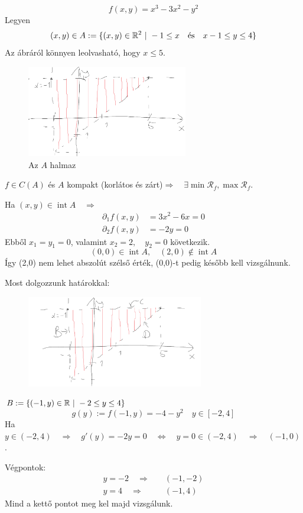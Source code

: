 \documentclass[a4paper,11.5pt]{article}
\DeclareMathOperator{\Int}{int}
\begin{document}
	\begin{task}
		\[ f(x,y)=x^3-3x^2-y^2 \]
		Legyen
		\[ (x,y)\in A:=\{ (x,y)\in\R^2\ | \ -1\leq x\quad \text{és}\quad x-1\leq y\leq 4 \} \]
		Az ábráról könnyen leolvasható, hogy $x\leq 5$.
		\begin{figure}[H]
			\centering
			\includegraphics[height=4cm]{../2zh/kepek/49.png}
			\caption{Az $A$ halmaz}
		\end{figure}
		
		$f\in C(A)$ és $A$ kompakt (korlátos és zárt)\quad $\Rightarrow\quad \exists\min\mathcal{R}_f, \max\mathcal{R}_f$.
		
		Ha $(x,y)\in\Int A\quad \Rightarrow$
		\begin{align*}
			\partial_1f(x,y)&=3x^2-6x=0\\
			\partial_2f(x,y)&=-2y=0
		\end{align*}
		Ebből $x_1=y_1=0$, valamint $x_2=2,\quad y_2=0$ következik. 
		\[ (0,0)\in\Int A,\quad (2,0)\notin\Int A \]
		Így (2,0) nem lehet abszolút szélső érték, (0,0)-t pedig később kell vizsgálnunk.
		
		Most dolgozzunk  határokkal:
		\begin{figure}[H]
			\centering
			\includegraphics[height=4cm]{../2zh/kepek/50.png}
			\caption{}
		\end{figure}
		
		
		$B:=\{ (-1,y)\in\mathbb{R}\ | \ -2\leq y\leq 4 \}$
		\[ g(y):=f(-1,y)=-4-y^2\quad y\in[-2,4] \]
		Ha $y\in(-2,4)\quad \Rightarrow\quad g'(y)=-2y=0\quad \Leftrightarrow\quad y=0\in(-2,4)\quad \Rightarrow\quad (-1,0)$.
		
		Végpontok:
		\begin{align*}
			y=-2\quad \Rightarrow&\quad (-1,-2)\\
			y=4\quad \Rightarrow&\quad (-1,4)
		\end{align*}
		Mind a kettő pontot meg kel majd vizsgálunk.
		

\end{task}
\end{document}
